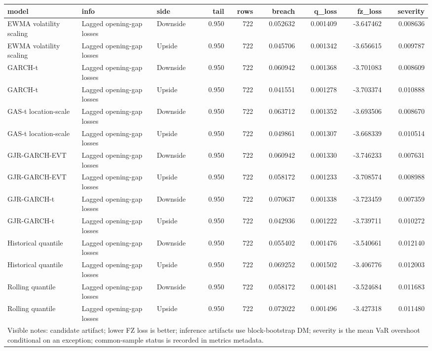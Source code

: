 \begin{tabular}{lllrrrrrr}
\toprule
model & info & side & tail & rows & breach & q_loss & fz_loss & severity \\
\midrule
EWMA volatility scaling & Lagged opening-gap losses & Downside & 0.950 & 722 & 0.052632 & 0.001409 & -3.647462 & 0.008636 \\
EWMA volatility scaling & Lagged opening-gap losses & Upside & 0.950 & 722 & 0.045706 & 0.001342 & -3.656615 & 0.009787 \\
GARCH-t & Lagged opening-gap losses & Downside & 0.950 & 722 & 0.060942 & 0.001368 & -3.701083 & 0.008609 \\
GARCH-t & Lagged opening-gap losses & Upside & 0.950 & 722 & 0.041551 & 0.001278 & -3.703374 & 0.010888 \\
GAS-t location-scale & Lagged opening-gap losses & Downside & 0.950 & 722 & 0.063712 & 0.001352 & -3.693506 & 0.008670 \\
GAS-t location-scale & Lagged opening-gap losses & Upside & 0.950 & 722 & 0.049861 & 0.001307 & -3.668339 & 0.010514 \\
GJR-GARCH-EVT & Lagged opening-gap losses & Downside & 0.950 & 722 & 0.060942 & 0.001330 & -3.746233 & 0.007631 \\
GJR-GARCH-EVT & Lagged opening-gap losses & Upside & 0.950 & 722 & 0.058172 & 0.001233 & -3.708574 & 0.008988 \\
GJR-GARCH-t & Lagged opening-gap losses & Downside & 0.950 & 722 & 0.070637 & 0.001338 & -3.723459 & 0.007359 \\
GJR-GARCH-t & Lagged opening-gap losses & Upside & 0.950 & 722 & 0.042936 & 0.001222 & -3.739711 & 0.010272 \\
Historical quantile & Lagged opening-gap losses & Downside & 0.950 & 722 & 0.055402 & 0.001476 & -3.540661 & 0.012140 \\
Historical quantile & Lagged opening-gap losses & Upside & 0.950 & 722 & 0.069252 & 0.001502 & -3.406776 & 0.012003 \\
Rolling quantile & Lagged opening-gap losses & Downside & 0.950 & 722 & 0.058172 & 0.001481 & -3.524684 & 0.011683 \\
Rolling quantile & Lagged opening-gap losses & Upside & 0.950 & 722 & 0.072022 & 0.001496 & -3.427318 & 0.011480 \\
\midrule
\multicolumn{9}{l}{\footnotesize Visible notes: candidate artifact; lower FZ loss is better; inference artifacts use block-bootstrap DM; severity is the mean VaR overshoot conditional on an exception; common-sample status is recorded in metrics metadata.} \\
\bottomrule
\end{tabular}

